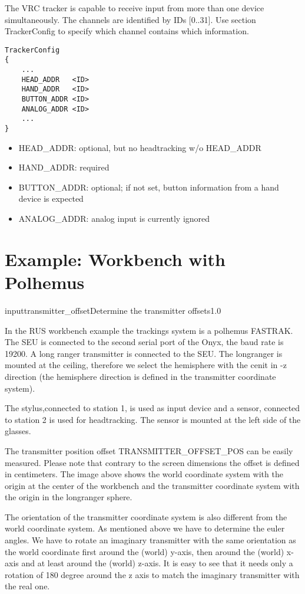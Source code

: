 The VRC tracker is capable to receive input from more than one device simultaneously. The
channels are identified by IDs [0..31]. Use section TrackerConfig to specify which channel
contains which information.

\begin{verbatim}
TrackerConfig
{
    ...
    HEAD_ADDR   <ID>
    HAND_ADDR   <ID>
    BUTTON_ADDR <ID>
    ANALOG_ADDR <ID>
    ...
}
\end{verbatim} 

\begin{itemize}
\item HEAD\_ADDR: optional, but no headtracking w/o HEAD\_ADDR 
\item HAND\_ADDR: required
\item BUTTON\_ADDR: optional; if not set, button information from a hand device is expected
\item ANALOG\_ADDR: analog input is currently ignored 
\end{itemize}

\clearpage


\section{Example: Workbench with Polhemus}

\begin{covimg}{input}{transmitter_offset}{Determine the transmitter offsets}{1.0}\end{covimg}
In the RUS workbench example the trackings system is a polhemus FASTRAK.
The SEU is connected to the second serial port of the Onyx, the baud
rate is 19200. A long ranger transmitter is connected to the SEU. The longranger
is mounted at the ceiling, therefore we select the hemisphere with the 
cenit in -z direction (the hemisphere direction is defined in the 
transmitter coordinate system).

The stylus,connected to station 1, is used as
input device and a sensor, connected to station 2 is used for headtracking.
The sensor is mounted at the left side of the glasses.

The transmitter position offset TRANSMITTER\_OFFSET\_POS can be easily
measured. Please note that contrary to the screen dimensions the offset
is defined in centimeters. The image above shows the world coordinate
system with the origin at the center of the workbench and the transmitter
coordinate system with the origin in the longranger sphere. 

The orientation of the transmitter coordinate system is also different
from the world coordinate system. As mentioned above we have to determine
the euler angles. We have to rotate an imaginary
transmitter with the same orientation as the world coordinate
first around the (world) y-axis, then around the (world) 
x-axis and at least around the (world) z-axis. It is easy to see that
it needs only a rotation of 180 degree around the z axis to match the
imaginary transmitter with the real one.

